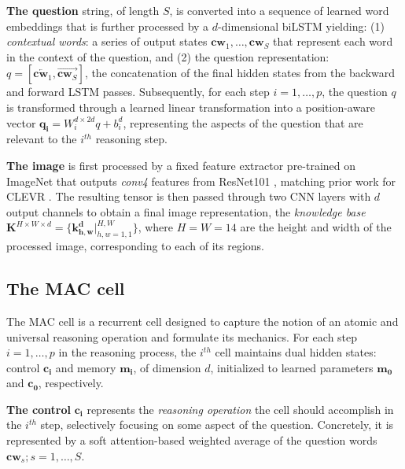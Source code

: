 \documentclass[fleqn]{article}
\begin{document}
\textbf{The question} string, of length \(S\), is converted into a sequence of learned word embeddings that is further processed by a \(d\)-dimensional biLSTM yielding: (1) \textit{contextual words}: a series of output states \({{\boldsymbol{cw}_1},\ldots,{\boldsymbol{cw}_S}}\) that represent each word in the context of the question, and (2) the question representation: \({q} = \left[ {\overleftarrow {\boldsymbol{cw}_1}} ,\overrightarrow {\boldsymbol{cw}_S} \right] \), the concatenation of the final hidden states from the backward and forward LSTM passes. Subsequently, for each step \(i=1,\ldots,p\), the question \({q}\) is transformed through a learned linear transformation into a position-aware vector \(\boldsymbol{q_i} ={{W}_{i}^{d\times 2d}}{q} + {{b}_{i}^d} \), representing the aspects of the question that are relevant to the \(i^{th}\) reasoning step.

\textbf{The image} is first processed by a fixed feature extractor pre-trained on ImageNet \citep{imagenet} that outputs \textit{conv4} features from ResNet101 \citep{imp1}, matching prior work for CLEVR \citep{nmn3,rn,film}. The resulting tensor is then passed through two CNN layers with \(d\) output channels to obtain a final image representation, the \textit{knowledge base} \(\boldsymbol{K}^{H{\times}W{\times}d}={\{\boldsymbol{k_{h,w}^d}|_{h,w=1,1}^{H,W}\}}\), where \(H = W = 14 \) are the height and width of the processed image, corresponding to each of its regions.

\subsection{The MAC cell}
\label{sec:MACcell}

The MAC cell is a recurrent cell designed to capture the notion of an atomic and universal reasoning operation and formulate its mechanics. For each step \(i=1,\ldots,p\) in the reasoning process, the \(i^{th}\) cell maintains dual hidden states: control \(\boldsymbol{c_i}\) and memory \(\boldsymbol{m_i}\), of dimension \(d\), initialized to learned parameters \(\boldsymbol{m_0}\) and \(\boldsymbol{c_0}\), respectively.

\textbf{The control} \(\boldsymbol{c_i}\) represents the \textit{reasoning operation} the cell should accomplish in the \(i^{th}\) step, selectively focusing on some aspect of the question. Concretely, it is represented by a soft attention-based weighted average of the question words \({\boldsymbol{cw}_s}; s=1,\ldots,S\).
\end{document}

